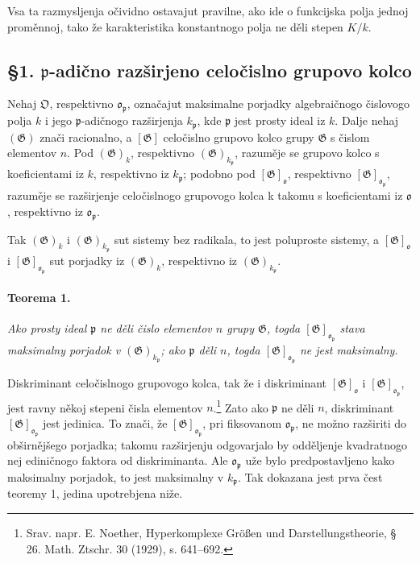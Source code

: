 \documentclass[11pt]{article}
\providecommand{\frakO}{\mathfrak{O}}
\providecommand{\frako}{\mathfrak{o}}
\providecommand{\frakp}{\mathfrak{p}}
\providecommand{\Gg}{\mathfrak{G}}
\begin{document}
Vsa ta razmysljenja očividno ostavajut pravilne, ako ide o funkcijska polja jednoj proměnnoj, tako že karakteristika konstantnogo polja ne děli stepen \(K/k\).

\subsection*{§1. \(\frakp\)-adično razširjeno celočislno grupovo kolco}

Nehaj \(\frakO\), respektivno \(\frako_\frakp\), označajut maksimalne porjadky algebraičnogo čislovogo polja \(k\) i jego \(\frakp\)-adičnogo razširjenja \(k_\frakp\), kde \(\frakp\) jest prosty ideal iz \(k\). Dalje nehaj \((\Gg)\) znači racionalno, a \([\Gg]\) celočislno grupovo kolco grupy \(\Gg\) s čislom elementov \(n\). Pod \((\Gg)_k\), respektivno \((\Gg)_{k_\frakp}\), razuměje se grupovo kolco s koeficientami iz \(k\), respektivno iz \(k_\frakp\); podobno pod \([\Gg]_\frako\), respektivno \([\Gg]_{\frako_\frakp}\), razuměje se razširjenje celočislnogo grupovogo kolca k takomu s koeficientami iz \(\frako\), respektivno iz \(\frako_\frakp\).

Tak \((\Gg)_k\) i \((\Gg)_{k_\frakp}\) sut sistemy bez radikala, to jest poluproste sistemy, a \([\Gg]_\frako\) i \([\Gg]_{\frako_\frakp}\) sut porjadky iz \((\Gg)_k\), respektivno iz \((\Gg)_{k_\frakp}\).

\paragraph{Teorema 1.}
\emph{Ako prosty ideal \(\frakp\) ne děli čislo elementov \(n\) grupy \(\Gg\), togda \([\Gg]_{\frako_\frakp}\) stava maksimalny porjadok v \((\Gg)_{k_\frakp}\); ako \(\frakp\) děli \(n\), togda \([\Gg]_{\frako_\frakp}\) ne jest maksimalny.}

Diskriminant celočislnogo grupovogo kolca, tak že i diskriminant \([\Gg]_\frako\) i \([\Gg]_{\frako_\frakp}\), jest ravny někoj stepeni čisla elementov \(n\).\footnote{Srav. napr. E. Noether, Hyperkomplexe Größen und Darstellungstheorie, § 26. Math. Ztschr. 30 (1929), s. 641--692.} Zato ako \(\frakp\) ne děli \(n\), diskriminant \([\Gg]_{\frako_\frakp}\) jest jedinica. To znači, že \([\Gg]_{\frako_\frakp}\), pri fiksovanom \(\frako_\frakp\), ne možno razširiti do obširnějšego porjadka; takomu razširjenju odgovarjalo by odděljenje kvadratnogo nej ediničnogo faktora od diskriminanta. Ale \(\frako_\frakp\) uže bylo predpostavljeno kako maksimalny porjadok, to jest maksimalny v \(k_\frakp\). Tak dokazana jest prva čest teoremy 1, jedina upotrebjena niže.
\end{document}
